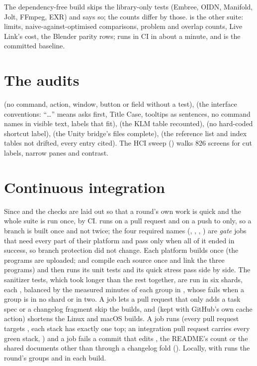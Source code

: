 The dependency-free build skips the library-only tests (Embree, OIDN, Manifold, Jolt, FFmpeg, EXR) and says so; the
counts differ by those.  is the other suite: limits, naive-against-optimised comparisons, problem
and overlap counts, Live Link's cost, the Blender parity rows;  runs in CI in about a minute, and
 is the committed baseline.

\section{The audits}
 (no command, action, window, button or field without a test),
 (the interface conventions: ``\ldots'' means asks first, Title Case,
tooltips as sentences, no command names in visible text, labels that fit),  (the KLM
table recounted),  (no hard-coded shortcut label), 
(the Unity bridge's  files complete),  (the reference list and index
tables not drifted, every entry cited). The HCI sweep () walks 826 screens for cut labels,
narrow panes and contrast.

\section{Continuous integration}
Since  and  the checks are laid out so that a round's own work is quick and the whole suite is run once,
by CI.  runs on a pull request and on a push to  only, so a branch is built once and not twice;
the four required names (, , , ) are \emph{gate} jobs that
need every part of their platform and pass only when all of it ended in success, so branch protection did not change.
Each platform builds once (the programs are uploaded;  and  compile each source
once and link the three programs) and then runs its unit tests and its quick stress pass side by side. The sanitizer
tests, which took longer than the rest together, are run in six shards, each , balanced
by the measured minutes of each group in , whose  fails when a group is in no
shard or in two. A  job lets a pull request that only adds a task spec or a changelog fragment skip
the builds, and  (kept with GitHub's own cache action) shortens the Linux and macOS builds. A 
job runs  (every pull request targets , each stack has exactly one top; an
integration pull request carries every green stack, ) and a  job fails a commit that edits
, the README's count or the shared documents other than through a changelog fold ().
Locally,  with  runs the round's groups and  in each build.

